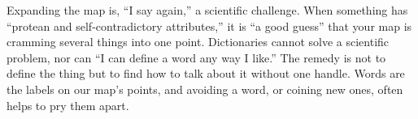 Expanding the map is, ``I say again,'' a scientific challenge. When something has ``protean and self-contradictory attributes,'' it is ``a good guess'' that your map is cramming several things into one point. Dictionaries cannot solve a scientific problem, nor can ``I can define a word any way I like.'' The remedy is not to define the thing but to find how to talk about it without one handle. Words are the labels on our map's points, and avoiding a word, or coining new ones, often helps to pry them apart.
